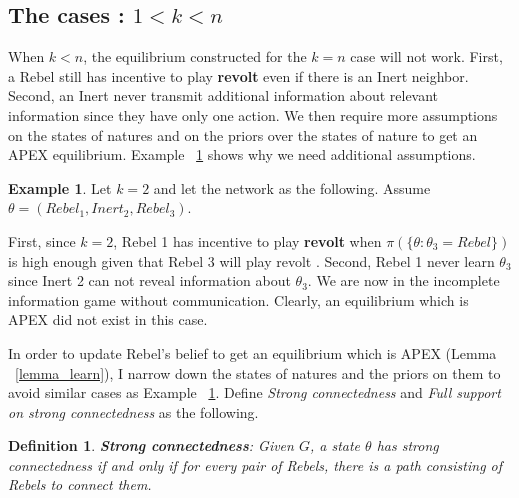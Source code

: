 \documentclass[12pt,letter]{article}
\newtheorem{definition}{Definition}[section]
\theoremstyle{definition}
\newtheorem{example}{Example}[section]
\theoremstyle{remark}
\theoremstyle{claim}
\begin{document}
\subsection{The cases : $1<k<n$}

When $k<n$, the equilibrium constructed for the $k=n$ case will not work. First, a Rebel still has incentive to play \textbf{revolt} even if there is an Inert neighbor. Second, an Inert never transmit additional information about relevant information since they have only one action. We then require more assumptions on the states of natures and on the priors over the states of nature to get an APEX equilibrium. Example ~\ref{ex_strong_connectedness} shows why we need additional assumptions.

\begin{example}\label{ex_strong_connectedness}
Let $k=2$ and let the network as the following. Assume $\theta=(Rebel_1,Inert_2,Rebel_3)$.

\begin{center}
\end{center}

First, since $k=2$, Rebel 1 has incentive to play \textbf{revolt} when $\pi(\{\theta:\theta_3=Rebel\})$ is high enough given that Rebel 3 will play revolt . Second, Rebel 1 never learn $\theta_3$ since Inert 2 can not reveal information about $\theta_3$. We are now in the incomplete information game without communication. Clearly, an equilibrium which is APEX did not exist in this case.

\end{example}

In order to update Rebel's belief to get an equilibrium which is APEX (Lemma ~\ref{lemma_learn}), I narrow down the states of natures and the priors on them to avoid similar cases as Example ~\ref{ex_strong_connectedness}. Define \textit{Strong connectedness} and \textit{Full support on strong connectedness} as the following.

\begin{definition}
\textbf{Strong connectedness}: Given $G$, a state $\theta$ has strong connectedness if and only if for every pair of Rebels, there is a path consisting of Rebels to connect them.
\end{definition}  
\end{document}
